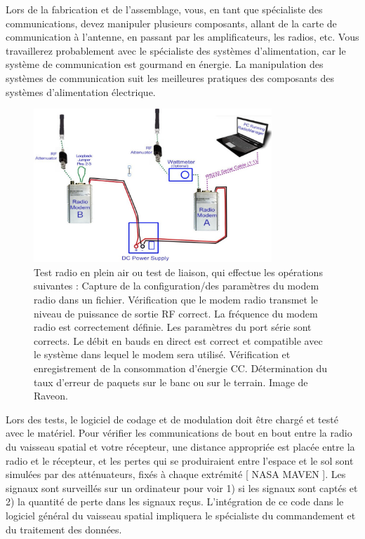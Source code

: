 Lors de la fabrication et de l'assemblage, vous, en tant que spécialiste des communications, devez manipuler plusieurs composants, allant de la carte de communication à l'antenne, en passant par les amplificateurs, les radios, etc. Vous travaillerez probablement avec le spécialiste des systèmes d'alimentation, car le système de communication est gourmand en énergie. La manipulation des systèmes de communication suit les meilleures pratiques des composants des systèmes d'alimentation électrique.
\begin{figure}[H] %
    \centering
    \includegraphics[width=0.8\textwidth]{figures/6-11.jpg}
    
    \caption{Test radio en plein air ou test de liaison, qui effectue les opérations suivantes : Capture de la configuration/des paramètres du modem radio dans un fichier. Vérification que le modem radio transmet le niveau de puissance de sortie RF correct. La fréquence du modem radio est correctement définie. Les paramètres du port série sont corrects. Le débit en bauds en direct est correct et compatible avec le système dans lequel le modem sera utilisé. Vérification et enregistrement de la consommation d'énergie CC. Détermination du taux d'erreur de paquets sur le banc ou sur le terrain. Image de Raveon.}
    \label{fig:communication2}
\end{figure}

Lors des tests, le logiciel de codage et de modulation doit être chargé et testé avec le matériel. Pour vérifier les communications de bout en bout entre la radio du vaisseau spatial et votre récepteur, une distance appropriée est placée entre la radio et le récepteur, et les pertes qui se produiraient entre l'espace et le sol sont simulées par des atténuateurs, fixés à chaque extrémité [ NASA MAVEN ]. Les signaux sont surveillés sur un ordinateur pour voir 1) si les signaux sont captés et 2) la quantité de perte dans les signaux reçus. L'intégration de ce code dans le logiciel général du vaisseau spatial impliquera le spécialiste du commandement et du traitement des données.

